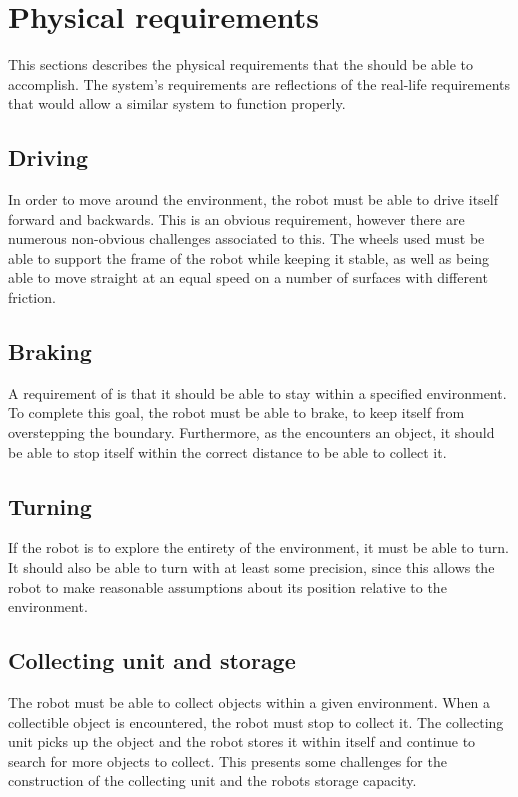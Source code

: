 \section{Physical requirements} \label{sec:physical_requirements}
This sections describes the physical requirements that the \projname{} should be able to accomplish. The system's requirements are reflections of the real-life requirements that would allow a similar system to function properly. 

\subsection{Driving}
In order to move around the environment, the robot must be able to drive itself forward and backwards. This is an obvious requirement, however there are numerous non-obvious challenges associated to this. The wheels used must be able to support the frame of the robot while keeping it stable, as well as being able to move straight at an equal speed on a number of surfaces with different friction.

\subsection{Braking}
A requirement of \projname{} is that it should be able to stay within a specified environment. To complete this goal, the robot must be able to brake, to keep itself from overstepping the boundary. Furthermore, as the \projname{} encounters an object, it should be able to stop itself within the correct distance to be able to collect it.

\subsection{Turning}
If the robot is to explore the entirety of the environment, it must be able to turn. It should also be able to turn with at least some precision, since this allows the robot to make reasonable assumptions about its position relative to the environment. 

\subsection{Collecting unit and storage}
The robot must be able to collect objects within a given environment. When a collectible object is encountered, the robot must stop to collect it. The collecting unit picks up the object and the robot stores it within itself and continue to search for more objects to collect. This presents some challenges for the construction of the collecting unit and the robots storage capacity.

